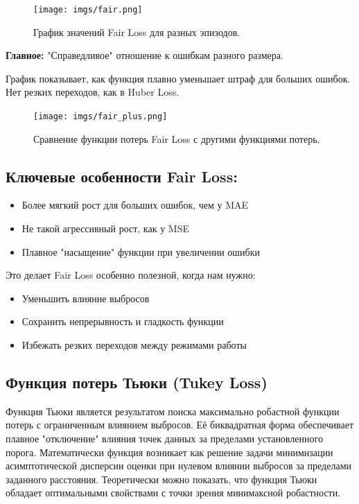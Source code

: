 \begin{figure}[h!]
    \centering
    \texttt{[image: imgs/fair.png]}
    \caption{График значений Fair Loss для разных эпизодов.}
\end{figure}

\textbf{Главное:} "Справедливое" отношение к ошибкам разного размера.

График показывает, как функция плавно уменьшает штраф для больших ошибок. Нет резких переходов, как в Huber Loss.

\begin{figure}[h!]
    \centering
    \texttt{[image: imgs/fair\_plus.png]}
    \caption{Сравнение функции потерь Fair Loss с другими функциями потерь.}
\end{figure}

\subsection*{Ключевые особенности Fair Loss:}
\begin{itemize}
    \item Более мягкий рост для больших ошибок, чем у MAE
    \item Не такой агрессивный рост, как у MSE
    \item Плавное "насыщение" функции при увеличении ошибки
\end{itemize}

Это делает Fair Loss особенно полезной, когда нам нужно:
\begin{itemize}
    \item Уменьшить влияние выбросов
    \item Сохранить непрерывность и гладкость функции
    \item Избежать резких переходов между режимами работы
\end{itemize}

\subsection{Функция потерь Тьюки (Tukey Loss)}

Функция Тьюки является результатом поиска максимально робастной функции потерь с ограниченным влиянием выбросов. Её биквадратная форма обеспечивает плавное "отключение" влияния точек данных за пределами установленного порога. Математически функция возникает как решение задачи минимизации асимптотической дисперсии оценки при нулевом влиянии выбросов за пределами заданного расстояния. Теоретически можно показать, что функция Тьюки обладает оптимальными свойствами с точки зрения минимаксной робастности.

